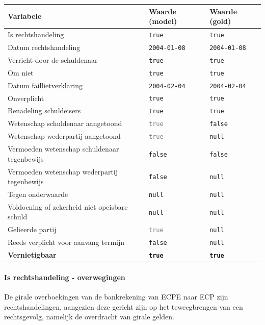 \documentclass[
  dutch,
  a4paper,
]{article}
\begin{document}
\begin{center}
\small
\begin{tabular}{@{}p{7.4cm}p{2.6cm}p{2.6cm}@{}}
\toprule
Variabele & Waarde (model) & Waarde (gold) \\
\midrule
Is rechtshandeling & \texttt{true} & \texttt{true} \\
Datum rechtshandeling & \texttt{2004-01-08} & \texttt{2004-01-08} \\
Verricht door de schuldenaar & \texttt{true} & \texttt{true} \\
Om niet & \texttt{true} & \texttt{true} \\
Datum faillietverklaring & \texttt{2004-02-04} & \texttt{2004-02-04} \\
Onverplicht & \texttt{true} & \texttt{true} \\
Benadeling schuldeisers & \texttt{true} & \texttt{true} \\
Wetenschap schuldenaar aangetoond & \textcolor{gray}{\texttt{true}} & \texttt{false} \\
Wetenschap wederpartij aangetoond & \textcolor{gray}{\texttt{true}} & \texttt{null} \\
Vermoeden wetenschap schuldenaar tegenbewijs & \texttt{false} & \texttt{false} \\
Vermoeden wetenschap wederpartij tegenbewijs & \texttt{false} & \texttt{null} \\
Tegen onderwaarde & \texttt{null} & \texttt{null} \\
Voldoening of zekerheid niet opeisbare schuld & \texttt{null} & \texttt{null} \\
Gelieerde partij & \textcolor{gray}{\texttt{true}} & \texttt{null} \\
Reeds verplicht voor aanvang termijn & \texttt{false} & \texttt{null} \\
\textbf{Vernietigbaar} & \textbf{\texttt{true}} & \textbf{\texttt{true}} \\
\bottomrule
\end{tabular}
\end{center}

\paragraph{Is rechtshandeling - overwegingen}\label{is-rechtshandeling---overwegingen-50}

De girale overboekingen van de bankrekening van ECPE naar ECP zijn rechtshandelingen, aangezien deze gericht zijn op het teweegbrengen van een rechtsgevolg, namelijk de overdracht van girale gelden.
\end{document}
